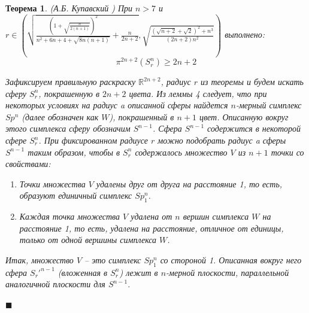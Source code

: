 \documentclass{report}%
\newtheorem{theorem}{Теорема}
\newenvironment{proof}{\par\noindent{\bf Доказательство.}}{\hfill$\scriptstyle\blacksquare$}
\begin{document}
\begin{theorem} (А.Б. Купавский \cite{Kupavsky2011})
		При $n > 7$ и $r \in \left(\sqrt{\frac{\left(1+\sqrt{\frac{n}{2(n+1)}}\right)^2}{n^2+6n+4+\sqrt{8n(n+1)}}+\frac{n}{2n+2}},
													\sqrt{\frac{(\sqrt{n+2} + \sqrt{2})^2+n^3}{(2n+2)n^2}}\right)$ выполнено:
		\begin{equation}
				\pi^{2n+2}(S_r^n) \geq 2n+2
		\end{equation}
		\begin{proof}
				Зафиксируем правильную раскраску $\mathbb{R}^{2n+2}$, радиус $r$ из теоремы и будем искать сферу $S_r^n$,
				покрашенную в $2n+2$ цвета. Из леммы 4 следует,
				что при некоторых условиях на радиус a описанной сферы найдется $n$-мерный симплекс $Sp^n$ (далее обозначен как $W$),
				покрашенный в $n+1$ цвет. Описанную вокруг этого симплекса сферу обозначим $S^{n-1}$.
				Сфера $S^{n-1}$ содержится в некоторой сфере $S_r^n$.
				При фиксированном радиусе $r$ можно подобрать радиус a сферы $S^{n-1}$ таким образом,
				чтобы в $S_r^n$ содержалось множество $V$ из $n + 1$ точки со свойствами:
				\begin{enumerate}
						\item Точки множества $V$ удалены друг от друга на расстояние 1, то есть, образуют единичный симплекс $Sp_1^n$.
						\item Каждая точка множества $V$ удалена от $n$ вершин симплекса $W$ на расстояние 1,
									то есть, удалена на расстояние, отличное от единицы, только от одной вершины симплекса $W$.
				\end{enumerate}
				Итак, множество $V$ – это симплекс $Sp_1^n$ со стороной 1.
				Описанная вокруг него сфера $S_r'^{n-1}$ (вложенная в $S_r^n$) лежит в $n$-мерной плоскости,
				параллельной аналогичной плоскости для $S^{n-1}$.
				

\end{proof}
\end{theorem}
\end{document}
